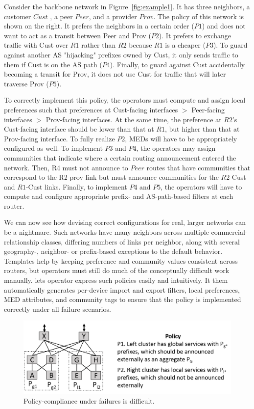 Consider the backbone network in Figure~\ref{fig:example1}. It has three neighbors, a customer $Cust$ , a peer $Peer$, and a provider $Prov$. The policy of this network is shown on the right. It prefers the neighbors in a certain order ($P1$) and does not want to act as a transit between Peer and Prov ($P2$). It prefers to exchange traffic with Cust over $R1$ rather than $R2$ because $R1$ is a cheaper ($P3$). To guard against another AS "hijacking" prefixes owned by Cust, it only sends traffic to them if Cust is on the AS path ($P4$). Finally, to guard against Cust accidentally becoming a transit for Prov, it does not use Cust for traffic that will later traverse Prov ($P5$).

To correctly implement this policy, the operators must compute and assign local preferences such that preferences at Cust-facing interfaces $>$ Peer-facing interfaces $>$ Prov-facing interfaces. At the same time, the preference at $R2$'s Cust-facing interface should be lower than that at $R1$, but higher than that at Prov-facing interface. To fully realize $P2$, MEDs will have to be appropriately configured as well. To implement $P3$ and $P4$, the operators may assign communities that indicate where a certain routing announcement entered the network. Then, R4 must not announce to $Peer$ routes that have communities that correspond to the R2-prov link but must announce communities for the $R2$-Cust and $R1$-Cust links. Finally, to implement $P4$ and $P5$, the operators will have to compute and configure appropriate prefix- and AS-path-based filters at each router.

We can now see how devising correct configurations for real, larger networks can be a nightmare. Such networks have many neighbors across multiple commercial-relationship classes, differing numbers of links per neighbor, along with several geography-, neighbor- or prefix-based exceptions to the default behavior. Templates help by keeping preference and community values consistent across routers, but operators must still do much of the conceptually difficult work manually.
\sysname lets operator express such policies easily and intuitively. It them automatically generates per-device import and export filters, local preferences, MED attributes, and community tags to ensure that the policy is implemented correctly under all failure scenarios.


\begin{figure}[t!]
\centering
\includegraphics[width=\columnwidth]{figures/example2}
\caption{Policy-compliance under failures is difficult.}
\label{fig:example2}
\end{figure}

